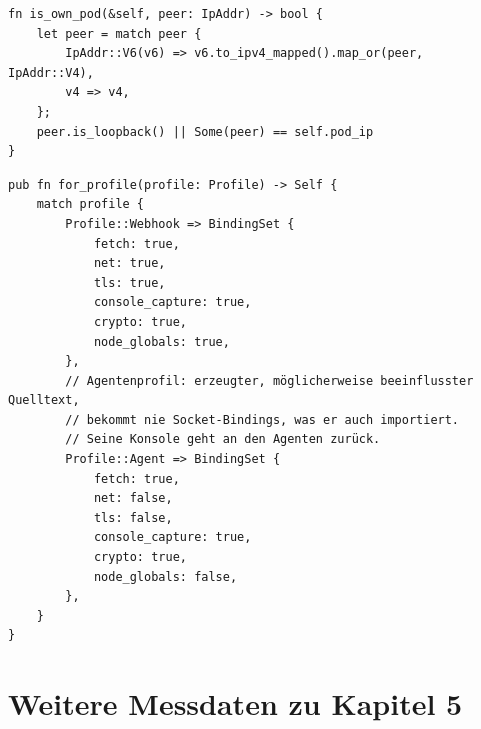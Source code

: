 \begin{lstlisting}[language=RustLang, caption={Absender im eigenen Pod werden als Quelle von Kommandos abgelehnt (\texttt{CommandHandler::is\_own\_pod}, Rust)}, label={lst:eigener-pod}]
fn is_own_pod(&self, peer: IpAddr) -> bool {
    let peer = match peer {
        IpAddr::V6(v6) => v6.to_ipv4_mapped().map_or(peer, IpAddr::V4),
        v4 => v4,
    };
    peer.is_loopback() || Some(peer) == self.pod_ip
}
\end{lstlisting}

\begin{lstlisting}[language=RustLang, caption={Zuordnung des Profils zu den Bindings (\texttt{BindingSet::for\_profile}, Rust)}, label={lst:bindings}]
pub fn for_profile(profile: Profile) -> Self {
    match profile {
        Profile::Webhook => BindingSet {
            fetch: true,
            net: true,
            tls: true,
            console_capture: true,
            crypto: true,
            node_globals: true,
        },
        // Agentenprofil: erzeugter, möglicherweise beeinflusster Quelltext,
        // bekommt nie Socket-Bindings, was er auch importiert.
        // Seine Konsole geht an den Agenten zurück.
        Profile::Agent => BindingSet {
            fetch: true,
            net: false,
            tls: false,
            console_capture: true,
            crypto: true,
            node_globals: false,
        },
    }
}
\end{lstlisting}


\section{Weitere Messdaten zu Kapitel 5}
\label{sec:messdaten}

